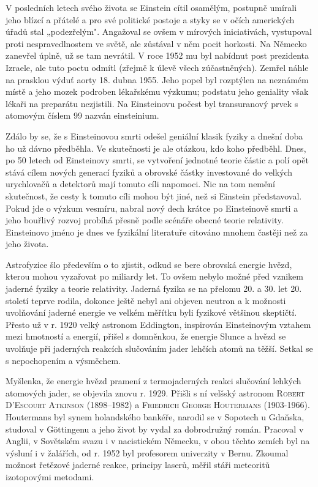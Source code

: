         V posledních letech svého života se Einstein cítil osamělým, postupně umírali jeho blízcí a
        přátelé a pro své politické postoje a styky se v očích amerických úřadů stal „podezřelým".
        Angažoval se ovšem v mírových iniciativách, vystupoval proti nespravedlnostem ve světě, ale
        zůstával v něm pocit horkosti. Na Německo zanevřel úplně, už se tam nevrátil. V roce 1952 mu
        byl nabídnut post prezidenta Izraele, ale tuto poctu odmítl (zřejmě k úlevě všech
        zúčastněných). Zemřel náhle na prasklou výduť aorty 18. dubna 1955. Jeho popel byl rozptýlen
        na neznámém místě a jeho mozek podroben lékařskému výzkumu; podstatu jeho geniality však
        lékaři na preparátu nezjistili. Na Einsteinovu počest byl transuranový prvek s atomovým
        číslem 99 nazván einsteinium.

        Zdálo by se, že s Einsteinovou smrti odešel geniální klasik fyziky a dnešní doba ho už dávno
        předběhla. Ve skutečnosti je ale otázkou, kdo koho předběhl. Dnes, po 50 letech od
        Einsteinovy smrti, se vytvoření jednotné teorie částic a polí opět stává cílem nových
        generací fyziků a obrovské částky investované do velkých urychlovačů a detektorů mají tomuto
        cíli napomoci. Nic na tom nemění skutečnost, že cesty k tomuto cíli mohou být jiné, než si
        Einstein představoval. Pokud jde o výzkum vesmíru, nabral nový dech krátce po Einsteinově
        smrti a jeho bouřlivý rozvoj probíhá přesně podle scénáře obecné teorie relativity.
        Einsteinovo jméno je dnes ve fyzikální literatuře citováno mnohem častěji než za jeho
        života.

        Astrofyzice šlo především o to zjistit, odkud se bere obrovská energie hvězd, kterou mohou
        vyzařovat po miliardy let. To ovšem nebylo možné před vznikem jaderné fyziky a teorie
        relativity. Jaderná fyzika se na přelomu 20. a 30. let 20. století teprve rodila, dokonce
        ještě nebyl ani objeven neutron a k možnosti uvolňování jaderné energie ve velkém měřítku
        byli fyzikové většinou skeptičtí. Přesto už v r. 1920 velký astronom Eddington, inspirován
        Einsteinovým vztahem mezi hmotností a energií, přišel s domněnkou, že energie Slunce a hvězd
        se uvolňuje při jaderných reakcích slučováním jader lehčích atomů na těžší. Setkal se s
        nepochopením a výsměchem.

        Myšlenka, že energie hvězd pramení z termojaderných reakci slučování lehkých atomových
        jader, se objevila znovu r. 1929. Přišli s ní velšský astronom \textsc{Robert D'Escourt
        Atkinson} (1898–1982) a \textsc{Friedrich George Houtermans} (1903-1966). Houtermans byl
        synem holandského bankéře, narodil se v Sopotech u Gdaňska, studoval v Göttingenu a jeho
        život by vydal za dobrodružný román. Pracoval v Anglii, v Sovětském svazu i v nacistickém
        Německu, v obou těchto zemích byl na výsluní i v žalářích, od r. 1952 byl profesorem
        univerzity v Bernu. Zkoumal možnost řetězové jaderné reakce, principy laserů, měřil stáři
        meteoritů izotopovými metodami.

